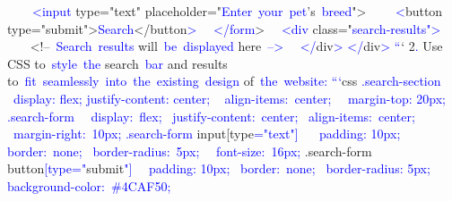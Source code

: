 \documentclass{article}
\begin{document}
\begin{tcolorbox}[colframe=black,colback=white]
{}\textcolor{blue}{~~~}\textcolor{blue}{~<}\textcolor{blue}{input} type="text" placeholder="\textcolor{blue}{Enter}\textcolor{blue}{~your}\textcolor{blue}{~pet}'s\textcolor{blue}{~breed}">
\textcolor{blue}{~~~}\textcolor{blue}{~<}button type="submit">\textcolor{blue}{Search}</button\textcolor{blue}{>
}\textcolor{blue}{~}\textcolor{blue}{~</}\textcolor{blue}{form}>
\textcolor{blue}{~}\textcolor{blue}{~<}\textcolor{blue}{div} class="\textcolor{blue}{search}\textcolor{blue}{-results}\textcolor{blue}{">
}\textcolor{blue}{~~~} <!--\textcolor{blue}{~Search}\textcolor{blue}{~results} will\textcolor{blue}{~be}\textcolor{blue}{~displayed} here\textcolor{blue}{~-->
}\textcolor{blue}{~}\textcolor{blue}{~</}div\textcolor{blue}{>
}\textcolor{blue}{</}div\textcolor{blue}{>
}\textcolor{blue}{``}`
2\textcolor{blue}{.} Use CSS to\textcolor{blue}{~style}\textcolor{blue}{~the} search\textcolor{blue}{~bar} and results to\textcolor{blue}{~fit}\textcolor{blue}{~seamlessly}\textcolor{blue}{~into}\textcolor{blue}{~the}\textcolor{blue}{~existing}\textcolor{blue}{~design} of\textcolor{blue}{~the}\textcolor{blue}{~website}\textcolor{blue}{:
}\textcolor{blue}{```}css\textcolor{blue}{
}\textcolor{blue}{.search}\textcolor{blue}{-section}\textcolor{blue}{~{
} \textcolor{blue}{~display}\textcolor{blue}{:} flex\textcolor{blue}{;
}  justify-content: center\textcolor{blue}{;
}\textcolor{blue}{~} align-items:\textcolor{blue}{~center}\textcolor{blue}{;
}\textcolor{blue}{~}\textcolor{blue}{~margin}-top: \textcolor{blue}{20}\textcolor{blue}{px}\textcolor{blue}{;
}}
\textcolor{blue}{.search}\textcolor{blue}{-form}\textcolor{blue}{~{
} \textcolor{blue}{~display}:\textcolor{blue}{~flex};
 \textcolor{blue}{~justify}-content:\textcolor{blue}{~center};
 \textcolor{blue}{~align}\textcolor{blue}{-items}:\textcolor{blue}{~center};
 \textcolor{blue}{~margin}-right:\textcolor{blue}{~}10\textcolor{blue}{px}\textcolor{blue}{;
}}
\textcolor{blue}{.search}\textcolor{blue}{-form} input[type\textcolor{blue}{="}\textcolor{blue}{text}\textcolor{blue}{"]}\textcolor{blue}{~{
}\textcolor{blue}{~} padding: \textcolor{blue}{10}px\textcolor{blue}{;
}  border:\textcolor{blue}{~none};
 \textcolor{blue}{~border}-radius:\textcolor{blue}{~}5px\textcolor{blue}{;
}\textcolor{blue}{~}\textcolor{blue}{~font}-size:\textcolor{blue}{~}16px;
}
.search-form button\textcolor{blue}{[type}\textcolor{blue}{="}submit\textcolor{blue}{"]}\textcolor{blue}{~{
} \textcolor{blue}{~padding}: 10px\textcolor{blue}{;
} \textcolor{blue}{~border}:\textcolor{blue}{~none};
 \textcolor{blue}{~border}-radius: 5px\textcolor{blue}{;
}  background-color\textcolor{blue}{:}\textcolor{blue}{~\#}4\textcolor{blue}{CAF}50\textcolor{blue}{;
}}
\end{tcolorbox}
\end{document}
